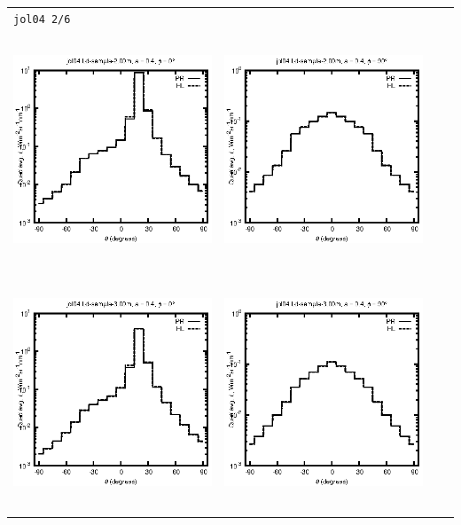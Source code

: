 \begin{tabular}{c c c c}
\multicolumn{4}{l}{\texttt{jol04 2/6}} \\
\includegraphics[height=7cm]{../eps/jol04_Ld_sample_2.00m_fwd.eps} &
\includegraphics[height=7cm]{../eps/jol04_Ld_sample_2.00m_cross.eps} \\
\includegraphics[height=7cm]{../eps/jol04_Ld_sample_3.00m_fwd.eps} &
\includegraphics[height=7cm]{../eps/jol04_Ld_sample_3.00m_cross.eps} \\

\end{tabular}
